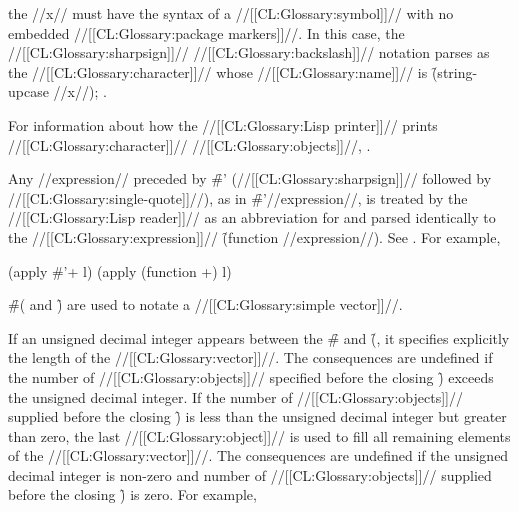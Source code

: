 the //x// must have the syntax of a //[[CL:Glossary:symbol]]//  with no embedded //[[CL:Glossary:package markers]]//. In this case, the //[[CL:Glossary:sharpsign]]// //[[CL:Glossary:backslash]]// notation parses as the //[[CL:Glossary:character]]// whose //[[CL:Glossary:name]]// is \f{(string-upcase //x//)}; \seesection\CharacterNames.

 

For information about how the //[[CL:Glossary:Lisp printer]]// prints //[[CL:Glossary:character]]// //[[CL:Glossary:objects]]//, \seesection\PrintingCharacters.

\endsubsubsection%

  

Any //expression// preceded by \f{\#'}  (//[[CL:Glossary:sharpsign]]// followed by //[[CL:Glossary:single-quote]]//), as in \f{\#'//expression//}, is treated by the //[[CL:Glossary:Lisp reader]]// as an abbreviation for and parsed identically  to the //[[CL:Glossary:expression]]// \f{(function //expression//)}. See .  For example,

\code (apply #'+ l) \EQ (apply (function +) l) \endcode

\endsubsubsection%
                      

\f{\#(} and \f{)} are used to notate a //[[CL:Glossary:simple vector]]//. 

If an unsigned decimal integer appears between the \f{\#} and \f{(}, it specifies explicitly the length of the //[[CL:Glossary:vector]]//.   The consequences are undefined if the number of //[[CL:Glossary:objects]]//  specified before the closing \f{)} exceeds the unsigned decimal integer. If the number of //[[CL:Glossary:objects]]// supplied before the closing \f{)} is less than the unsigned decimal integer but greater than zero, the last //[[CL:Glossary:object]]// is used to fill all remaining elements of the //[[CL:Glossary:vector]]//.  The consequences are undefined if the unsigned decimal integer is non-zero and number of //[[CL:Glossary:objects]]// supplied before the closing \f{)} is zero. For example,

